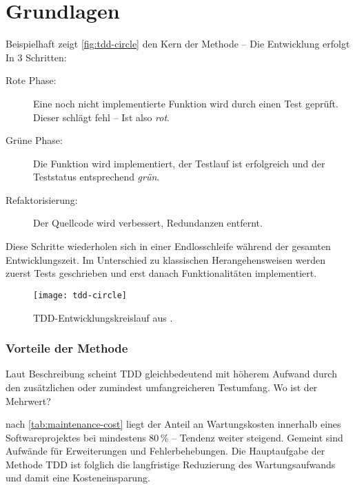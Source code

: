\chapter{Grundlagen}
\label{cha:Grundlagen}

%
% 
%
%


Beispielhaft zeigt \autoref{fig:tdd-circle} den Kern der Methode -- Die Entwicklung erfolgt In 3 Schritten:

\begin{description}
	\item[Rote Phase:] Eine noch nicht implementierte Funktion wird durch einen Test geprüft. Dieser schlägt fehl -- Ist also \textit{rot}.
	\item[Grüne Phase:] Die Funktion wird implementiert, der Testlauf ist erfolgreich und der Teststatus entsprechend \textit{grün}.
	\item[Refaktorisierung:] Der Quellcode wird verbessert, Redundanzen entfernt.
\end{description}
Diese Schritte wiederholen sich in einer Endlosschleife während der gesamten Entwicklungszeit. Im Unterschied zu klassischen Herangehensweisen werden zuerst Tests geschrieben und erst danach Funktionalitäten implementiert.

\begin{figure}
	\centering
	\texttt{[image: tdd-circle]} 
	\caption[TDD-Entwicklungskreislauf]{TDD-Entwicklungskreislauf aus \cite{heise2013}.}
	\label{fig:tdd-circle}
\end{figure}

\subsection{Vorteile der Methode}
Laut Beschreibung scheint \ac{TDD} gleichbedeutend mit höherem Aufwand durch den zusätzlichen oder zumindest umfangreicheren Testumfang. Wo ist der Mehrwert? 

\ZB nach \autoref{tab:maintenance-cost} liegt der Anteil an Wartungskosten innerhalb eines Softwareprojektes bei mindestens 80\,\% -- Tendenz weiter steigend. Gemeint sind Aufwände für Erweiterungen und Fehlerbehebungen. Die Hauptaufgabe der Methode \ac{TDD} ist folglich die langfristige Reduzierung des Wartungsaufwands und damit eine Kosteneinsparung.


